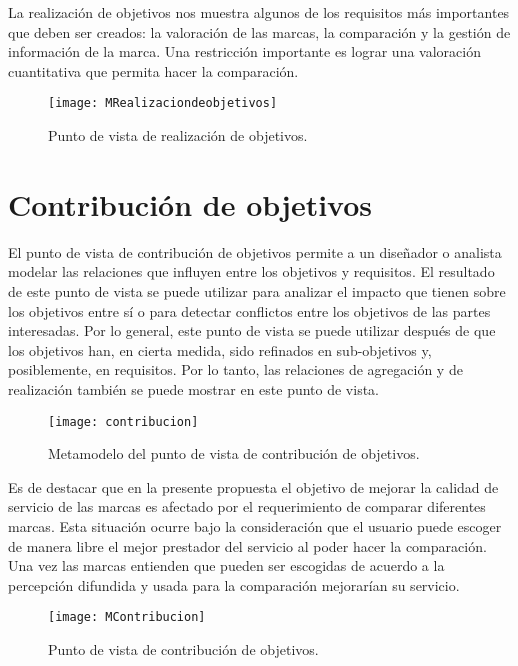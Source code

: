 
La realización de objetivos nos muestra algunos de los requisitos más importantes que deben ser creados: la valoración de las marcas, la comparación y la gestión de información de la marca. Una restricción importante es lograr una valoración cuantitativa que permita hacer la comparación.

\begin{figure}[H]
\centering
\texttt{[image: MRealizaciondeobjetivos]}
\caption{Punto de vista de realización de objetivos.}
\end{figure}

\section{Contribución de objetivos}
El punto de vista de contribución de objetivos permite a un diseñador o analista modelar las relaciones que influyen entre los objetivos y requisitos. El resultado de este punto de vista se puede utilizar para analizar el impacto que tienen sobre los objetivos entre sí o para detectar conflictos entre los objetivos de las partes interesadas. Por lo general, este punto de vista se puede utilizar después de  que los objetivos han, en cierta medida, sido refinados en sub-objetivos y, posiblemente, en requisitos. Por lo tanto, las relaciones de agregación y de realización también se puede mostrar en este punto de vista.

\begin{figure}[H]
\centering
\texttt{[image: contribucion]}
\caption{Metamodelo del punto de vista de contribución de objetivos.}
\end{figure}

Es de destacar que en la presente propuesta el objetivo de mejorar la calidad de servicio de las marcas es afectado por el requerimiento de comparar diferentes marcas. Esta situación ocurre bajo la consideración que el usuario puede escoger de manera libre el mejor prestador del servicio al poder hacer la comparación. Una vez las marcas entienden que pueden ser escogidas de acuerdo a la percepción difundida y usada para la comparación mejorarían su servicio.

\begin{figure}[H]
\centering
\texttt{[image: MContribucion]}
\caption{Punto de vista de contribución de objetivos.}
\end{figure}

